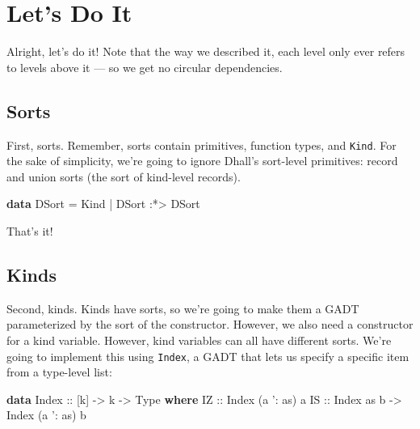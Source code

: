 \documentclass[]{article}
\newenvironment{Shaded}{}{}
\newcommand{\DataTypeTok}[1]{\textcolor[rgb]{0.56,0.13,0.00}{#1}}
\newcommand{\FunctionTok}[1]{\textcolor[rgb]{0.02,0.16,0.49}{#1}}
\newcommand{\KeywordTok}[1]{\textcolor[rgb]{0.00,0.44,0.13}{\textbf{#1}}}
\newcommand{\NormalTok}[1]{#1}
\newcommand{\OtherTok}[1]{\textcolor[rgb]{0.00,0.44,0.13}{#1}}
\begin{document}
\hypertarget{lets-do-it}{%
\section{Let's Do It}\label{lets-do-it}}

Alright, let's do it! Note that the way we described it, each level only ever
refers to levels above it --- so we get no circular dependencies.

\hypertarget{sorts}{%
\subsection{Sorts}\label{sorts}}

First, sorts. Remember, sorts contain primitives, function types, and
\texttt{Kind}. For the sake of simplicity, we're going to ignore Dhall's
sort-level primitives: record and union sorts (the sort of kind-level records).

\begin{Shaded}
\begin{Highlighting}[]
\KeywordTok{data} \DataTypeTok{DSort} \FunctionTok{=} \DataTypeTok{Kind}
           \FunctionTok{|} \DataTypeTok{DSort} \FunctionTok{:*>} \DataTypeTok{DSort}
\end{Highlighting}
\end{Shaded}

That's it!

\hypertarget{kinds}{%
\subsection{Kinds}\label{kinds}}

Second, kinds. Kinds have sorts, so we're going to make them a GADT
parameterized by the sort of the constructor. However, we also need a
constructor for a kind variable. However, kind variables can all have different
sorts. We're going to implement this using \texttt{Index}, a GADT that lets us
specify a specific item from a type-level list:

\begin{Shaded}
\begin{Highlighting}[]
\KeywordTok{data} \DataTypeTok{Index}\OtherTok{ ::}\NormalTok{ [k] }\OtherTok{->}\NormalTok{ k }\OtherTok{->} \DataTypeTok{Type} \KeywordTok{where}
    \DataTypeTok{IZ}\OtherTok{ ::} \DataTypeTok{Index}\NormalTok{ (a '}\FunctionTok{:}\NormalTok{ as) a}
    \DataTypeTok{IS}\OtherTok{ ::} \DataTypeTok{Index}\NormalTok{ as b }\OtherTok{->} \DataTypeTok{Index}\NormalTok{ (a '}\FunctionTok{:}\NormalTok{ as) b}
\end{Highlighting}
\end{Shaded}
\end{document}
